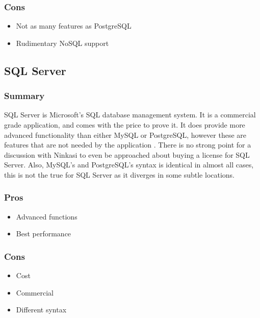\documentclass[draftclsnofoot,onecolumn,journal,letterpaper,compsoc,10pt]{IEEEtran}
\begin{document}
        \subsubsection{Cons}
        \begin{itemize}
            \item Not as many features as PostgreSQL
            \item Rudimentary NoSQL support
        \end{itemize}
        
    \subsection{SQL Server}
    
        \subsubsection{Summary}
        
        SQL Server is Microsoft's SQL database management system.  It is a commercial grade application, and comes with the price to prove it.  It does provide more advanced functionality than either MySQL or PostgreSQL, however these are features that are not needed by the application \cite{sql_server}.  There is no strong point for a discussion with Ninkasi to even be approached about buying a license for SQL Server.  Also, MySQL's and PostgreSQL's syntax is identical in almost all cases, this is not the true for SQL Server as it diverges in some subtle locations.
        
        \subsubsection{Pros}
        \begin{itemize}
            \item Advanced functions
            \item Best performance
        \end{itemize}
        
        \subsubsection{Cons}
        \begin{itemize}
            \item Cost
            \item Commercial
            \item Different syntax
        \end{itemize}
    
\end{document}
